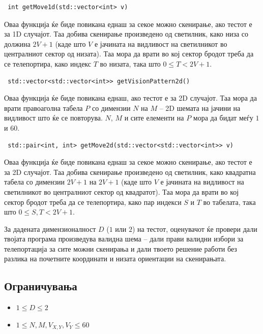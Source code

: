 \documentclass[12pt]{article}
\begin{document}
\begin{lstlisting}
 int getMove1d(std::vector<int> v)
\end{lstlisting}

Оваа функција ќе биде повикана еднаш за секое можно скенирање, ако тестот е за 1D случајот. Таа добива скенирање произведено од светилник, како низа со должина $2V + 1$ (каде што $V$ е јачината на видливост на светилникот во централниот сектор од низата). Таа мора да врати во кој сектор бродот треба да се телепортира, како индекс $T$ во низата, така што $0 \leq T < 2V + 1$.

\begin{lstlisting}
 std::vector<std::vector<int>> getVisionPattern2d()
\end{lstlisting}

Оваа функција ќе биде повикана еднаш, ако тестот е за 2D случајот. Таа мора да врати правоаголна табела $P$ со димензии $N$ на $M$ -- 2D шемата на јачини на видливост што ќе се повторува. $N$, $M$ и сите елементи на $P$ мора да бидат меѓу $1$ и $60$.

\begin{lstlisting}
 std::pair<int, int> getMove2d(std::vector<std::vector<int>> v)
\end{lstlisting}

Оваа функција ќе биде повикана еднаш за секое можно скенирање, ако тестот е за 2D случајот. Таа добива скенирање произведено од светилник, како квадратна табела со димензии $2V + 1$ на $2V + 1$ (каде што $V$ е јачината на видливост на светилникот во централниот сектор од квадратот). Таа мора да врати во кој сектор бродот треба да се телепортира, како пар индекси $S$ и $T$ во табелата, така што $0 \leq S, T < 2V + 1$.

За дадената димензионалност $D$ ($1$ или $2$) на тестот, оценувачот ќе провери дали твојата програма произведува валидна шема -- дали прави валидни избори за телепортација за сите можни скенирања и дали твоето решение работи без разлика на почетните координати и низата ориентации на скенирањата.

\subsection{Ограничувања}

\vspace{0.1em}

\begin{itemize}
\item $1 \leq D \leq 2$
\item $1 \leq N, M, V_{X, Y}, V_Y \leq 60$
\end{itemize}
\end{document}
